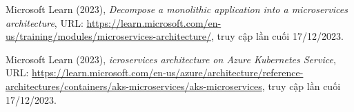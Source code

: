 \begin{thebibliography}{1}
Microsoft Learn (2023), \emph{Decompose a monolithic application into a microservices architecture}, URL: \url{https://learn.microsoft.com/en-us/training/modules/microservices-architecture/}, truy cập lần cuối 17/12/2023.

Microsoft Learn (2023), \emph{icroservices architecture on Azure Kubernetes Service}, URL: \url{https://learn.microsoft.com/en-us/azure/architecture/reference-architectures/containers/aks-microservices/aks-microservices}, truy cập lần cuối 17/12/2023.



\end{thebibliography}